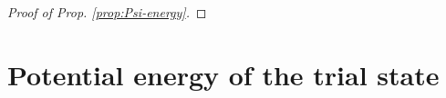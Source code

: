 \documentclass[a4paper,11pt]{article}
\def\eps{\varepsilon}
\numberwithin{equation}{section}
\def\be{\begin{equation}}
\def\ee{\end{equation}}
\begin{document}
\begin{proof}[Proof of Prop. \ref{prop:Psi-energy}]
%

\end{proof}


\section{Potential energy of the trial state}  
\label{sec:pot}
\end{document}
